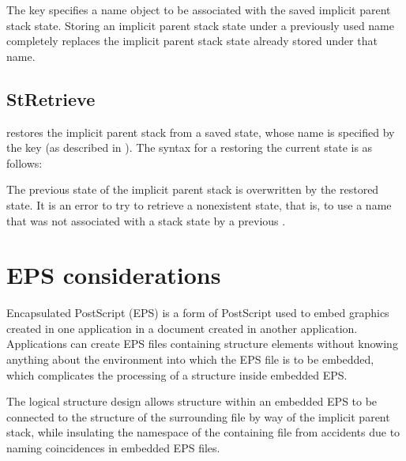 \documentclass[letterpaper,12pt,english,openany,oneside]{sphinxmanual}
\begin{document}
\begin{sphinxVerbatim}[commandchars=\\\{\}]
 \PYG{p}{[} 
         
\end{sphinxVerbatim}

The  key specifies a name object to be associated with the saved implicit parent stack state. Storing an implicit parent stack state under a previously used name completely replaces the implicit parent stack state already stored under that name.


\subsection{StRetrieve}
\label{\detokenize{pdfmark_Logical:stretrieve}}
 restores the implicit parent stack from a saved state, whose name is specified by the  key (as described in ). The syntax for a restoring the current state is as follows:

\begin{sphinxVerbatim}[commandchars=\\\{\}]
 \PYG{p}{[} 
  
\end{sphinxVerbatim}

The previous state of the implicit parent stack is overwritten by the restored state. It is an error to try to retrieve a nonexistent state, that is, to use a name that was not associated with a stack state by a previous  .


\section{EPS considerations}
\label{\detokenize{pdfmark_Logical:eps-considerations}}
Encapsulated PostScript (EPS) is a form of PostScript used to embed graphics created in one application in a document created in another application. Applications can create EPS files containing structure elements without knowing anything about the environment into which the EPS file is to be embedded, which complicates the processing of a structure inside embedded EPS.

The logical structure design allows structure within an embedded EPS to be connected to the structure of the surrounding file by way of the implicit parent stack, while insulating the namespace of the containing file from accidents due to naming coincidences in embedded EPS files.
\end{document}
